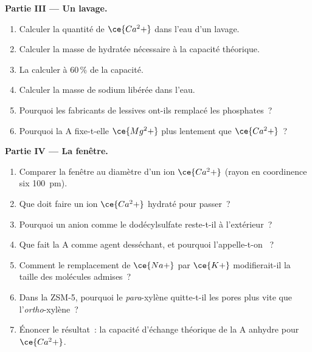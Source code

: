 \begin{problem}
\medskip\noindent\textbf{Partie III --- Un lavage.}
\begin{enumerate}[resume]
  \item Calculer la quantité de $\ce{Ca^2+}$ dans l'eau d'un lavage.
  \item Calculer la masse de  hydratée nécessaire à la capacité
        théorique.
  \item La calculer à 60\,\% de la capacité.
  \item Calculer la masse de sodium libérée dans l'eau.
  \item Pourquoi les fabricants de lessives ont-ils remplacé les
        phosphates~?
  \item Pourquoi la  A fixe-t-elle $\ce{Mg^2+}$ plus lentement que $\ce{Ca^2+}$~?
\end{enumerate}

\medskip\noindent\textbf{Partie IV --- La fenêtre.}
\begin{enumerate}[resume]
  \item Comparer la fenêtre au diamètre d'un ion $\ce{Ca^2+}$ (rayon en coordinence six
        \qty{100}{pm}).
  \item Que doit faire un ion $\ce{Ca^2+}$ hydraté pour passer~?
  \item Pourquoi un anion  comme le dodécylsulfate reste-t-il à
        l'extérieur~?
  \item Que fait la  A comme agent desséchant, et pourquoi
        l'appelle-t-on ~?
  \item Comment le remplacement de $\ce{Na+}$ par $\ce{K+}$ modifierait-il la taille des molécules admises~?
  \item Dans la ZSM-5, pourquoi le \textit{para}-xylène quitte-t-il les pores plus vite que l'\textit{ortho}-xylène~?
  \item Énoncer le résultat~: la capacité d'échange théorique de la
         A anhydre pour $\ce{Ca^2+}$.
\end{enumerate}
\end{problem}
